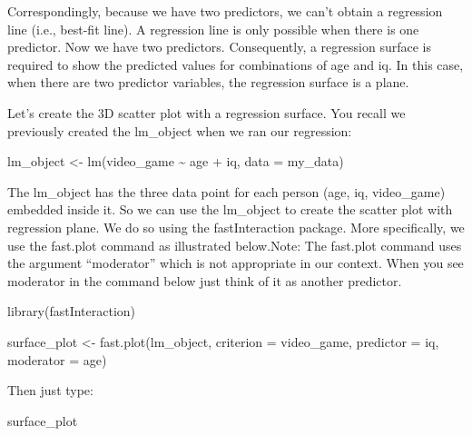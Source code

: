\documentclass[
]{krantz}
\makeatletter
\newenvironment{Shaded}{\begin{snugshade}}{\end{snugshade}}
\newcommand{\AttributeTok}[1]{\textcolor[rgb]{0.61,0.61,0.61}{#1}}
\newcommand{\FunctionTok}[1]{\textcolor[rgb]{0,0,0}{#1}}
\newcommand{\NormalTok}[1]{#1}
\newcommand{\OtherTok}[1]{\textcolor[rgb]{0.37,0.37,0.37}{#1}}
\newcommand{\SpecialCharTok}[1]{\textcolor[rgb]{0,0,0}{#1}}
\newenvironment{kframe}{%
\medskip{}
\setlength{\fboxsep}{.8em}
 \def\at@end@of@kframe{}%
 \ifinner\ifhmode%
  \def\at@end@of@kframe{\end{minipage}}%
  \begin{minipage}{\columnwidth}%
 \fi\fi%
 \def\FrameCommand##1{\hskip\@totalleftmargin \hskip-\fboxsep
 \colorbox{shadecolor}{##1}\hskip-\fboxsep
     \hskip-\linewidth \hskip-\@totalleftmargin \hskip\columnwidth}%
 \MakeFramed {\advance\hsize-\width
   \@totalleftmargin\z@ \linewidth\hsize
   \@setminipage}}%
 {\par\unskip\endMakeFramed%
 \at@end@of@kframe}
\renewenvironment{Shaded}{\begin{kframe}}{\end{kframe}}
\makeatother
\begin{document}
Correspondingly, because we have two predictors, we can't obtain a regression line (i.e., best-fit line). A regression line is only possible when there is one predictor. Now we have two predictors. Consequently, a regression surface is required to show the predicted values for combinations of age and iq. In this case, when there are two predictor variables, the regression surface is a plane.

Let's create the 3D scatter plot with a regression surface. You recall we previously created the lm\_object when we ran our regression:

\begin{Shaded}
\begin{Highlighting}[]
\NormalTok{lm\_object }\OtherTok{\textless{}{-}} \FunctionTok{lm}\NormalTok{(video\_game }\SpecialCharTok{\textasciitilde{}}\NormalTok{ age }\SpecialCharTok{+}\NormalTok{ iq,}
                    \AttributeTok{data =}\NormalTok{ my\_data)}
\end{Highlighting}
\end{Shaded}

The lm\_object has the three data point for each person (age, iq, video\_game) embedded inside it. So we can use the lm\_object to create the scatter plot with regression plane. We do so using the fastInteraction package. More specifically, we use the fast.plot command as illustrated below.Note: The fast.plot command uses the argument ``moderator'' which is not appropriate in our context. When you see moderator in the command below just think of it as another predictor.

\begin{Shaded}
\begin{Highlighting}[]
\FunctionTok{library}\NormalTok{(fastInteraction)}

\NormalTok{surface\_plot }\OtherTok{\textless{}{-}} \FunctionTok{fast.plot}\NormalTok{(lm\_object,}
                          \AttributeTok{criterion =}\NormalTok{ video\_game,}
                          \AttributeTok{predictor =}\NormalTok{ iq,}
                          \AttributeTok{moderator =}\NormalTok{ age)}
\end{Highlighting}
\end{Shaded}

Then just type:

\begin{Shaded}
\begin{Highlighting}[]
\NormalTok{surface\_plot}
\end{Highlighting}
\end{Shaded}
\end{document}
